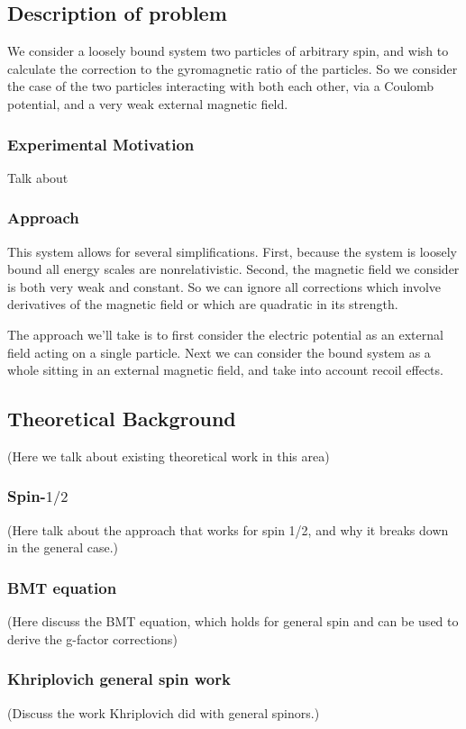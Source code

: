 \subsection{Description of problem}
We consider a loosely bound system two particles of arbitrary spin, and wish to calculate the correction to the gyromagnetic ratio of the particles.  So we consider the case of the two particles interacting with both each other, via a Coulomb potential, and a very weak external magnetic field.
\subsubsection{Experimental Motivation}

Talk about 


\subsubsection{Approach}
This system allows for several simplifications.  First, because the system is loosely bound all energy scales are nonrelativistic.  
Second, the magnetic field we consider is both very weak and constant.  So we can ignore all corrections which involve derivatives of the magnetic field or which are quadratic in its strength.

The approach we'll take is to first consider the electric potential as an external field acting on a single particle.  Next we can consider the bound system as a whole sitting in an external magnetic field, and take into account recoil effects.


\subsection{Theoretical Background}

(Here we talk about existing theoretical work in this area)
\subsubsection{Spin-$1/2$}

(Here talk about the approach that works for spin 1/2, and why it breaks down in the general case.)

\subsubsection{BMT equation}

(Here discuss the BMT equation, which holds for general spin and can be used to derive the g-factor corrections)

\subsubsection{Khriplovich general spin work}
(Discuss the work Khriplovich did with general spinors.)
